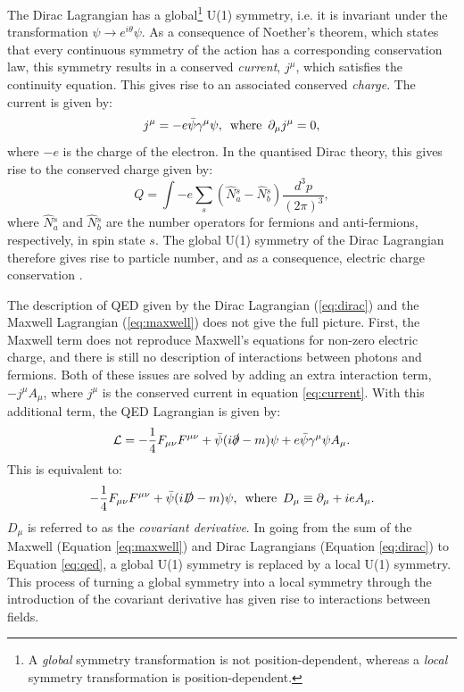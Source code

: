 The Dirac Lagrangian has a global\footnote{A \textit{global} symmetry transformation is not position-dependent, whereas a \textit{local} symmetry transformation is position-dependent.} U(1) symmetry, i.e. it is invariant under the transformation $\psi\rightarrow e^{i\theta}\psi$. As a consequence of Noether's theorem, which states that every continuous symmetry of the action has a corresponding conservation law, this symmetry results in a conserved \textit{current}, $j^\mu$, which satisfies the continuity equation. This gives rise to an associated conserved \textit{charge}. The current is given by:
\begin{equation}\label{eq:current}
    j^\mu=-e\bar{\psi}\gamma^\mu\psi, \hspace{5pt}\text{where}\hspace{5pt} \partial_\mu j^\mu=0,
\end{equation} 
where $-e$ is the charge of the electron. In the quantised Dirac theory, this gives rise to the conserved charge given by:
\begin{equation}
    Q=\int-e\sum_s(\hat{N}{}_a^s-\hat{N}{}_b^s)\frac{d^3p}{(2\pi)^3},
\end{equation}
where $\hat{N}{}_a^s$ and $\hat{N}{}_b^s$ are the number operators for fermions and anti-fermions, respectively, in spin state $s$. The global U(1) symmetry of the Dirac Lagrangian therefore gives rise to particle number, and as a consequence, electric charge conservation \cite{Theory:PeskinSchroeder}.  

The description of QED given by the Dirac Lagrangian (\ref{eq:dirac}) and the Maxwell Lagrangian (\ref{eq:maxwell}) does not give the full picture. First, the Maxwell term does not reproduce Maxwell's equations for non-zero electric charge, and there is still no description of interactions between photons and fermions. Both of these issues are solved by adding an extra interaction term, $-j^\mu A_\mu$, where $j^\mu$ is the conserved current in equation \ref{eq:current}. With this additional term, the QED Lagrangian is given by:
\begin{equation}
    \mathcal{L}=-\frac{1}{4}F_{\mu\nu}F^{\mu\nu} + \bar{\psi}(i\slashed{\partial}-m)\psi + e\bar{\psi}\gamma^\mu\psi A_\mu.
\end{equation}
This is equivalent to:
\begin{equation}\label{eq:qed}
    -\frac{1}{4}F_{\mu\nu}F^{\mu\nu} + \bar{\psi}(i\slashed{D}-m)\psi, \hspace{5pt}\text{where}\hspace{5pt} D_\mu\equiv\partial_\mu+ieA_\mu.
\end{equation}
$D_\mu$ is referred to as the \textit{covariant derivative}. In going from the sum of the Maxwell (Equation \ref{eq:maxwell}) and Dirac Lagrangians (Equation \ref{eq:dirac}) to Equation \ref{eq:qed}, a global U(1) symmetry is replaced by a local U(1) symmetry. This process of turning a global symmetry into a local symmetry through the introduction of the covariant derivative has given rise to interactions between fields.

